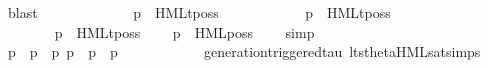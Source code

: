 \begin{isabellebody}
\ blast\isanewline
\ \ \ \ \isamarkupfalse%
\isanewline
\ \ \isamarkupfalse%
\isanewline
\ \ \ \ \isamarkupfalse%
\ {\isacartoucheopen}{\isasymtheta}{\isacharparenleft}{\kern0pt}p{\isacharparenright}{\kern0pt}\ {\isasymTurnstile}\ {\isasymsigma}{\isacharparenleft}{\kern0pt}HMLt{\isacharunderscore}{\kern0pt}poss\ {\isasymalpha}\ {\isasymphi}{\isacharparenright}{\kern0pt}{\isacartoucheclose}\isanewline
\ \ \ \ \isamarkupfalse%
\ {\isacartoucheopen}{\isasymalpha}\ {\isacharequal}{\kern0pt}\ {\isasymtau}\ {\isasymLongrightarrow}\ p\ {\isasymTTurnstile}\ HMLt{\isacharunderscore}{\kern0pt}poss\ {\isasymalpha}\ {\isasymphi}{\isacartoucheclose}\ \isamarkupfalse%
\ {\isacharminus}{\kern0pt}\isanewline
\ \ \ \ \ \ \isamarkupfalse%
\ {\isacartoucheopen}{\isasymalpha}\ {\isacharequal}{\kern0pt}\ {\isasymtau}{\isacartoucheclose}\isanewline
\ \ \ \ \ \ \isamarkupfalse%
\ {\isacartoucheopen}{\isasymtheta}{\isacharparenleft}{\kern0pt}p{\isacharparenright}{\kern0pt}\ {\isasymTurnstile}\ {\isasymsigma}{\isacharparenleft}{\kern0pt}HMLt{\isacharunderscore}{\kern0pt}poss\ {\isasymalpha}\ {\isasymphi}{\isacharparenright}{\kern0pt}{\isacartoucheclose}\ \isamarkupfalse%
\ {\isacartoucheopen}{\isasymtheta}{\isacharparenleft}{\kern0pt}p{\isacharparenright}{\kern0pt}\ {\isasymTurnstile}\ HML{\isacharunderscore}{\kern0pt}poss\ {\isasymtau}\ {\isasymsigma}{\isacharparenleft}{\kern0pt}{\isasymphi}{\isacharparenright}{\kern0pt}{\isacartoucheclose}\ \isamarkupfalse%
\ simp\isanewline
\ \ \ \ \ \ \isamarkupfalse%
\ \isamarkupfalse%
\ p{\isacharprime}{\kern0pt}\ \ {\isacartoucheopen}{\isasymtheta}{\isacharparenleft}{\kern0pt}p{\isacharparenright}{\kern0pt}\ {\isasymlongmapsto}\isactrlsup {\isasymtheta}{\isasymtau}\ {\isasymtheta}{\isacharparenleft}{\kern0pt}p{\isacharprime}{\kern0pt}{\isacharparenright}{\kern0pt}{\isacartoucheclose}\ {\isacartoucheopen}p\ {\isasymlongmapsto}{\isasymtau}\ p{\isacharprime}{\kern0pt}{\isacartoucheclose}\ \ {\isacartoucheopen}{\isasymtheta}{\isacharparenleft}{\kern0pt}p{\isacharprime}{\kern0pt}{\isacharparenright}{\kern0pt}\ {\isasymTurnstile}\ {\isasymsigma}{\isacharparenleft}{\kern0pt}{\isasymphi}{\isacharparenright}{\kern0pt}{\isacartoucheclose}\isanewline
\ \ \ \ \ \ \ \ \isamarkupfalse%
\ generation{\isacharunderscore}{\kern0pt}triggered{\isacharunderscore}{\kern0pt}tau\ lts{\isacharunderscore}{\kern0pt}theta{\isachardot}{\kern0pt}HML{\isacharunderscore}{\kern0pt}sat{\isachardot}{\kern0pt}simps{\isacharparenleft}{\kern0pt}{}{\isacharparenright}{\kern0pt}\ \isamarkupfalse%

\end{isabellebody}
